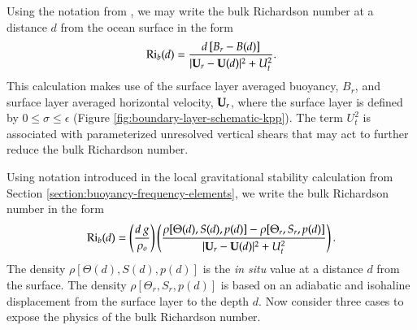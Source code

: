 Using the notation from \cite{LargeKPP}, we may write the bulk
Richardson number at a distance $d$ from the ocean surface in the form
\begin{equation}
  \mbox{Ri}_{b} (d) = \frac{d \, [B_{r} - B(d) ]}{ |{\bf U}_{r} - {\bf U}(d)|^{2} + U_{t}^{2}}. 
\label{eq:bulk-ri-large-kpp-large-etal-form}
\end{equation}
This calculation makes use of the surface layer averaged buoyancy,
$B_{r}$, and surface layer averaged horizontal velocity, ${\bf
  U}_{r}$, where the surface layer is defined by $0 \le \sigma \le
\epsilon$ (Figure \ref{fig:boundary-layer-schematic-kpp}). The term
$U_{t}^{2}$ is associated with parameterized unresolved vertical
shears that may act to further reduce the bulk Richardson number.

Using notation introduced in the local gravitational stability
calculation from Section \ref{section:buoyancy-frequency-elements}, we
write the bulk Richardson number in the form
\begin{equation}
  \mbox{Ri}_{b}(d) = \left( \frac{d \, g}{\rho_{o}} \right) 
   \left( 
   \frac{\rho[\Theta(d), S(d), p(d)]   - \rho[\Theta_{r}, S_{r}, p(d)]}{ |{\bf U}_{r} - {\bf U}(d)|^{2} + U_{t}^{2}}
  \right). 
\label{eq:bulk-ri-large-kpp}
\end{equation}
The density $\rho[\Theta(d), S(d), p(d)]$ is the {\it in situ} value
at a distance $d$ from the surface.  The density $\rho[\Theta_{r},
S_{r}, p(d)]$ is based on an adiabatic and isohaline displacement from
the surface layer to the depth $d$.  Now consider three cases to
expose the physics of the bulk Richardson number.
